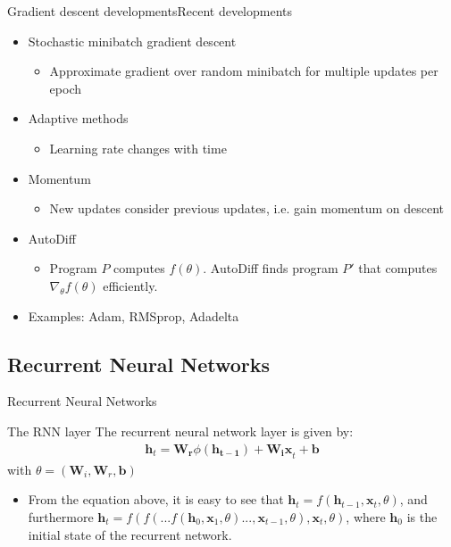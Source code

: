 \documentclass[handout]{beamer}
\theoremstyle{definition}
\theoremstyle{remark}
\newcommand*{\V}[1]{\mathbf{#1}}%
\begin{document}
\begin{frame}{Gradient descent developments}{Recent developments}
  \begin{itemize}
      \item { Stochastic minibatch gradient descent \pause 
        \begin{itemize}
          \item Approximate gradient over random minibatch for multiple updates per epoch \pause
        \end{itemize}
      }
      \item{ Adaptive methods \pause
        \begin{itemize}
          \item Learning rate changes with time \pause
        \end{itemize}
      }
      \item {Momentum \pause
        \begin{itemize}
          \item New updates consider previous updates, i.e. gain momentum on descent\pause
        \end{itemize}
      }
      \item{
        AutoDiff \pause
        \begin{itemize}
          \item Program $P$ computes $f(\theta)$. AutoDiff finds program $P'$ that computes $\nabla_\theta f(\theta)$ efficiently.
        \end{itemize}
      }
      \item{
        Examples: Adam, RMSprop, Adadelta
      }
  \end{itemize}
\end{frame}


\subsection{Recurrent Neural Networks}

\begin{frame}{Recurrent Neural Networks}
  \begin{block}{The RNN layer}
  The recurrent neural network layer is given by:
  \begin{align*}
      \V{h}_t = \V{W_r}\phi(\V{h_{t-1}}) + \V{W_ix}_t + \V{b}
  \end{align*}
  with $\theta = (\V{W}_i, \V{W}_r, \V{b})$
  \end{block}
  
  \begin{itemize}
      \item{ From the equation above, it is easy to see that $\V{h}_t = f(\V{h}_{t-1}, \V{x}_t, \theta)$, and furthermore $\V{h}_t = f(f(...f(\V{h}_0, \V{x}_1, \theta)..., \V{x}_{t-1}, \theta), \V{x}_t, \theta)$, where $\V{h}_0$ is the initial state of the recurrent network. \pause}
  \end{itemize}
\end{frame}
\end{document}
